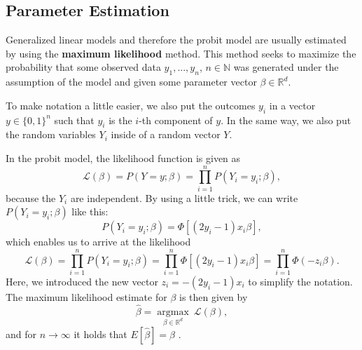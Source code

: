 \subsection{Parameter Estimation}
\label{sec:parameter-estimation}

Generalized linear models and therefore the probit model are usually
estimated by using the \textbf{maximum likelihood} method.
This method seeks to maximize the probability that some observed
data $y_1, ..., y_n$, $n \in \mathbb{N}$ was generated under the
assumption of the model and given some parameter vector
$\beta \in \mathbb{R}^d$.

To make notation a little easier, we also put the outcomes $y_i$
in a vector $y \in \{0, 1\}^n$ such that $y_i$ is the $i$-th
component of $y$. In the same way, we also put the random
variables $Y_i$ inside of a random vector $Y$.

In the probit model, the likelihood function is given as
\begin{equation}
    \label{eq:likelihood}
    \mathcal{L}(\beta) = P(Y=y ; \beta) = \prod_{i=1}^n P(Y_i=y_i ; \beta),
\end{equation}
because the $Y_i$ are independent. By using a little trick, we can
write $P(Y_i=y_i;\beta)$ like this:
\begin{equation*}
    P(Y_i = y_i ; \beta) = \Phi[(2y_i - 1) x_i \beta],
\end{equation*}
which enables us to arrive at the likelihood
\begin{equation}
    \mathcal{L}(\beta) = \prod_{i=1}^n P(Y_i=y_i ; \beta)
    = \prod_{i=1}^n \Phi[(2y_i - 1) x_i \beta]
    = \prod_{i=1}^n \Phi(- z_i \beta).
\end{equation}
Here, we introduced the new vector $z_i = - (2y_i - 1) x_i$ to simplify
the notation.
The maximum likelihood estimate for $\beta$ is then given by
\begin{equation}
    \label{eq:maximum-likelihood-estimate}
    \hat{\beta} = \underset{\beta \in \mathbb{R}^d}{\operatorname{argmax}}\
    \mathcal{L}(\beta),
\end{equation}
and for $n \rightarrow \infty$ it holds that
$E[\hat{\beta}] = \beta$ \cite{regression-fahrmeir}.

